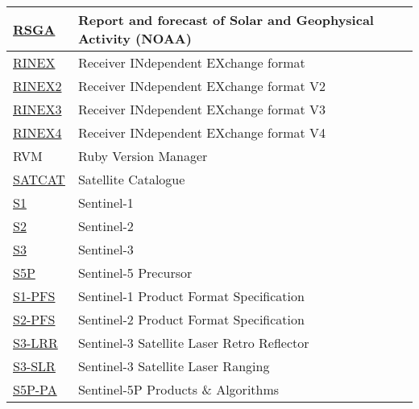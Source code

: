 \documentclass[dec_sum_main.tex]{subfiles}
\begin{document}
\begin{longtable}{|m{2.8cm}|m{10cm}|}
	\href{https://www.swpc.noaa.gov/products/solar-and-geophysical-activity-summary}{RSGA} & Report and forecast of Solar and Geophysical Activity  (NOAA)\\ \hline
	\href{https://www.igs.org/wg/rinex/#documents-formats}{RINEX} & Receiver INdependent EXchange format \\ \hline
	\href{https://files.igs.org/pub/data/format/rinex211.txt}{RINEX2} & Receiver INdependent EXchange format V2 \\ \hline
	\href{https://files.igs.org/pub/data/format/rinex305.pdf}{RINEX3} & Receiver INdependent EXchange format V3 \\ \hline
	\href{https://files.igs.org/pub/data/format/rinex_4.00.pdf}{RINEX4} & Receiver INdependent EXchange format V4 \\ \hline	
	RVM & Ruby Version Manager \\ \hline
    \href{https://celestrak.com/satcat/search.php}{SATCAT} & Satellite Catalogue \\ \hline
	\href{https://sentinels.copernicus.eu/web/sentinel/missions/sentinel-1}{S1} & Sentinel-1 \\ \hline
	\href{https://sentinels.copernicus.eu/web/sentinel/missions/sentinel-2}{S2} & Sentinel-2 \\ \hline
	\href{https://sentinels.copernicus.eu/web/sentinel/missions/sentinel-3}{S3} & Sentinel-3 \\ \hline
    \href{https://sentinels.copernicus.eu/web/sentinel/missions/sentinel-5p}{S5P} & Sentinel-5 Precursor \\ \hline
	\href{https://sentinels.copernicus.eu/documents/247904/1877131/S1-RS-MDA-52-7441-3-9-2_Sentinel-1ProductSpecification.pdf/4f4488ef-60ad-52cb-160c-71ebdf6ca820?t=1641274625444}{S1-PFS} & Sentinel-1 Product Format Specification\\ \hline
	\href{https://sentinels.copernicus.eu/documents/247904/685211/S2-PDGS-TAS-DI-PSD-V14.9.pdf/3d3b6c9c-4334-dcc4-3aa7-f7c0deffbaf7?t=1643013091529}{S2-PFS} & Sentinel-2 Product Format Specification\\ \hline
	\href{https://sentinels.copernicus.eu/web/sentinel/technical-guides/sentinel-3-altimetry/instrument/lrr}{S3-LRR} & Sentinel-3 Satellite Laser Retro Reflector\\ \hline	
	\href{https://sentinels.copernicus.eu/web/sentinel/technical-guides/sentinel-3-altimetry/pod/slr-tracking}{S3-SLR} & Sentinel-3 Satellite Laser Ranging\\ \hline
    \href{https://sentinels.copernicus.eu/web/sentinel/technical-guides/sentinel-5p/products-algorithms}{S5P-PA} & Sentinel-5P Products \& Algorithms\\ \hline

\end{longtable}
\end{document}
